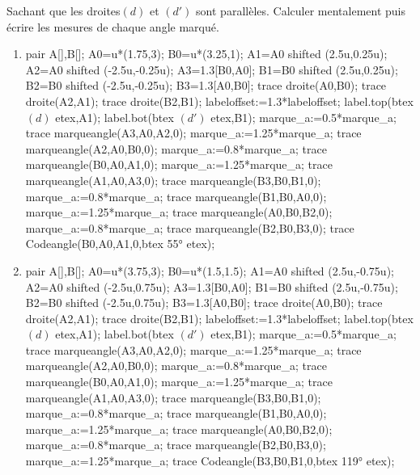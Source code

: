 \begin{exercice*}
   Sachant que les droites$(d)$ et $(d')$ sont parallèles. Calculer mentalement puis écrire les mesures de chaque angle marqué.
   \begin{enumerate}
     \item \phantom{rrr}
     \begin{Geometrie}[CoinHD={(6u,4u)}]
         pair A[],B[];
         A0=u*(1.75,3);
         B0=u*(3.25,1);
         A1=A0 shifted (2.5u,0.25u);
         A2=A0 shifted (-2.5u,-0.25u);
         A3=1.3[B0,A0];
         B1=B0 shifted (2.5u,0.25u);
         B2=B0 shifted (-2.5u,-0.25u);
         B3=1.3[A0,B0];
         trace droite(A0,B0);
         trace droite(A2,A1);
         trace droite(B2,B1);
         labeloffset:=1.3*labeloffset;
         label.top(btex $(d)$ etex,A1);
         label.bot(btex $(d')$ etex,B1);         
         marque_a:=0.5*marque_a;
         trace marqueangle(A3,A0,A2,0);
         marque_a:=1.25*marque_a;
         trace marqueangle(A2,A0,B0,0);
         marque_a:=0.8*marque_a;
         trace marqueangle(B0,A0,A1,0);
         marque_a:=1.25*marque_a;
         trace marqueangle(A1,A0,A3,0);
         trace marqueangle(B3,B0,B1,0);
         marque_a:=0.8*marque_a;
         trace marqueangle(B1,B0,A0,0);
         marque_a:=1.25*marque_a;
         trace marqueangle(A0,B0,B2,0);
         marque_a:=0.8*marque_a;
         trace marqueangle(B2,B0,B3,0);
         trace Codeangle(B0,A0,A1,0,btex \ang{55} etex);
      \end{Geometrie}
      \item \phantom{rrr}
      \begin{Geometrie}[CoinHD={(7u,4u)}]
         pair A[],B[];
         A0=u*(3.75,3);
         B0=u*(1.5,1.5);
         A1=A0 shifted (2.5u,-0.75u);
         A2=A0 shifted (-2.5u,0.75u);
         A3=1.3[B0,A0];
         B1=B0 shifted (2.5u,-0.75u);
         B2=B0 shifted (-2.5u,0.75u);
         B3=1.3[A0,B0];
         trace droite(A0,B0);
         trace droite(A2,A1);
         trace droite(B2,B1);
         labeloffset:=1.3*labeloffset;
         label.top(btex $(d)$ etex,A1);
         label.bot(btex $(d')$ etex,B1);         
         marque_a:=0.5*marque_a;
         trace marqueangle(A3,A0,A2,0);
         marque_a:=1.25*marque_a;
         trace marqueangle(A2,A0,B0,0);
         marque_a:=0.8*marque_a;
         trace marqueangle(B0,A0,A1,0);
         marque_a:=1.25*marque_a;
         trace marqueangle(A1,A0,A3,0);
         trace marqueangle(B3,B0,B1,0);
         marque_a:=0.8*marque_a;
         trace marqueangle(B1,B0,A0,0);
         marque_a:=1.25*marque_a;
         trace marqueangle(A0,B0,B2,0);
         marque_a:=0.8*marque_a;
         trace marqueangle(B2,B0,B3,0);
         marque_a:=1.25*marque_a;
         trace Codeangle(B3,B0,B1,0,btex \ang{119} etex);         
      \end{Geometrie}
   \end{enumerate}
\end{exercice*} 
